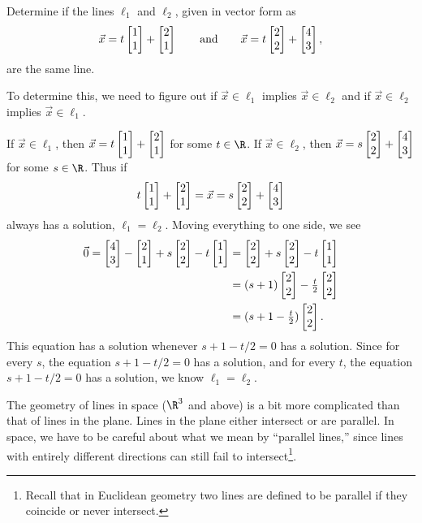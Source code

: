 \begin{example}
	Determine if the lines $\ell_1$ and $\ell_2$, given in vector form as 
	\[
		\vec x=t\mat{1\\1}+\mat{2\\1}\qquad\text{and}\qquad
		\vec x=t\mat{2\\2}+\mat{4\\3},
	\]
	are the same line.  
	
	To determine this, we need to figure out if $\vec x\in\ell_1$
	implies $\vec x\in \ell_2$ and if $\vec x\in\ell_2$ implies $\vec x\in\ell_1$.

	If $\vec x\in\ell_1$, then $\vec x=t\mat{1\\1}+\mat{2\\1}$ for some $t\in\R$.  If
	$\vec x\in\ell_2$, then $\vec x=s\mat{2\\2}+\mat{4\\3}$ for some $s\in \R$.  Thus if
	\[
		t\mat{1\\1}+\mat{2\\1} = \vec x = s\mat{2\\2}+\mat{4\\3}
	\]
	always has a solution, $\ell_1=\ell_2$.  Moving everything to one side, we see
	\begin{align*}
		\vec 0 = \mat{4\\3}-\mat{2\\1} + s\mat{2\\2}-t\mat{1\\1}
		&=\mat{2\\2}+s\mat{2\\2}-t\mat{1\\1}\\
		&=(s+1)\mat{2\\2}-\tfrac{t}{2}\mat{2\\2}\\
		&= (s+1-\tfrac{t}{2})\mat{2\\2}.
	\end{align*}
	This equation has a solution whenever $s+1-t/2=0$ has a solution.  Since for every $s$, the
	equation $s+1-t/2=0$ has a solution, and for every $t$, the equation $s+1-t/2=0$ has a solution,
	we know $\ell_1=\ell_2$.
\end{example}


The geometry of lines in space ($\R^3$ and above) is a bit more complicated than that of lines
in the plane.  Lines in the plane either intersect or are parallel.
In space,  we have to be careful about what we mean by
``parallel lines,'' since lines with entirely different directions can
still fail to intersect\footnote{ Recall that in Euclidean geometry
two lines are defined to be parallel if they coincide or never intersect.}.

